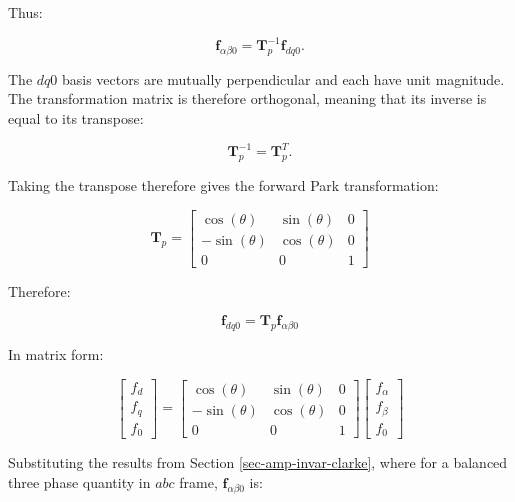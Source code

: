 \documentclass{article}
\begin{document}
Thus:

\begin{equation}
    \mathbf{f}_{\alpha\beta0}
    =
    \mathbf{T}_p^{-1}\mathbf{f}_{dq0}.
\end{equation}

The $dq0$ basis vectors are mutually perpendicular and each have unit magnitude. The transformation matrix is therefore orthogonal, meaning that its inverse is equal to its transpose:

\begin{equation}
    \mathbf{T}_p^{-1}
    =
    \mathbf{T}_p^T.
\end{equation}

Taking the transpose therefore gives the forward Park transformation:

\begin{equation}
    \mathbf{T}_p
    =
    \begin{bmatrix}
        \cos(\theta) & \sin(\theta) & 0 \\
        -\sin(\theta) & \cos(\theta) & 0 \\
        0 & 0 & 1
    \end{bmatrix}
\end{equation}

Therefore:

\begin{equation}
    \mathbf{f}_{dq0}
    =
    \mathbf{T}_p\mathbf{f}_{\alpha\beta0}
\end{equation}

In matrix form:

\begin{equation}
    \begin{bmatrix}
        f_d \\
        f_q \\
        f_0
    \end{bmatrix}
    =
    \begin{bmatrix}
        \cos(\theta) & \sin(\theta) & 0 \\
        -\sin(\theta) & \cos(\theta) & 0 \\
        0 & 0 & 1
    \end{bmatrix}
    \begin{bmatrix}
        f_\alpha \\
        f_\beta \\
        f_0
    \end{bmatrix}
\end{equation}

Substituting the results from Section \ref{sec-amp-invar-clarke}, where for a balanced three phase quantity in $abc$ frame, $\mathbf{f}_{\alpha\beta0}$ is:
\end{document}
